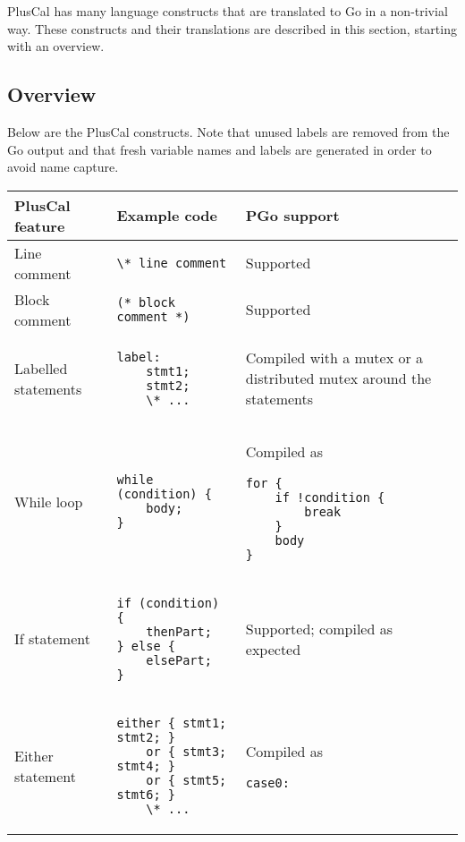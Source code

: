 PlusCal has many language constructs that are translated to Go in a non-trivial way. These constructs and their translations are described in this section, starting with an overview.

\subsection{Overview}
Below are the PlusCal constructs. Note that unused labels are removed from the Go output and that fresh variable names and labels are generated in order to avoid name capture.

\begin{center}
\lstset{style=tabularstyle}
\renewcommand{\arraystretch}{1.5}
\begin{longtable}{ || m{} | m{} | m{} || }
	\hline
	\textbf{PlusCal feature} & \textbf{Example code} & \textbf{PGo support} \\
	\hline\hline
	Line comment & \lstinline[language=pcal]|\* line comment| & Supported \\
	\hline
	Block comment & \lstinline[language=pcal]|(* block comment *)| & Supported \\
	\hline
	Labelled statements &
	\begin{lstlisting}[language=pcal]
label:
	stmt1;
	stmt2;
	\* ...
	\end{lstlisting} &
	Compiled with a mutex or a distributed mutex around the statements \\
	\hline
	While loop &
	\begin{lstlisting}[language=pcal]
while (condition) {
	body;
}
	\end{lstlisting} &
	Compiled as
	\begin{lstlisting}[language=golang]
for {
	if !condition {
		break
	}
	body
}
	\end{lstlisting} \\
	\hline
	If statement &
	\begin{lstlisting}[language=pcal]
if (condition) {
	thenPart;
} else {
	elsePart;
}
	\end{lstlisting} &
	Supported; compiled as expected \\
	\hline
	Either statement &
	\begin{lstlisting}[language=pcal]
either { stmt1; stmt2; }
    or { stmt3; stmt4; }
    or { stmt5; stmt6; }
    \* ...
	\end{lstlisting} &
	Compiled as
	\begin{lstlisting}[language=golang]
case0:

\end{lstlisting}
\end{longtable}
\end{center}
